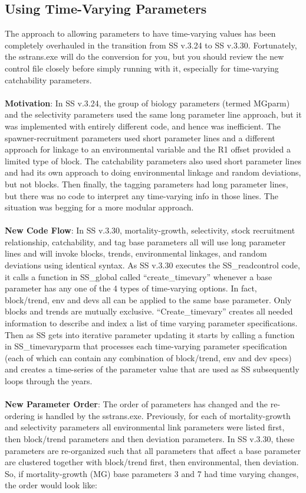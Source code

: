 \hypertarget{TVpara}{}
\subsection{Using Time-Varying Parameters}
 The approach to allowing parameters to have time-varying values has been completely overhauled in the transition from SS v.3.24 to SS v.3.30.  Fortunately, the sstrans.exe will do the conversion for you, but you should review the new control file closely before simply running with it, especially for time-varying catchability parameters.
 \\\\
 \noindent \textbf{Motivation}:  In SS v.3.24, the group of biology parameters (termed MGparm) and the selectivity parameters used the same long parameter line approach, but it was implemented with entirely different code, and hence was inefficient.  The spawner-recruitment parameters used short parameter lines and a different approach for linkage to an environmental variable and the R1 offset provided a limited type of block.  The catchability parameters also used short parameter lines and had its own approach to doing environmental linkage and random deviations, but not blocks.  Then finally, the tagging parameters had long parameter lines, but there was no code to interpret any time-varying info in those lines.  The situation was begging for a more modular approach.
 \\\\
 \noindent \textbf{New Code Flow}:  In SS v.3.30, mortality-growth, selectivity, stock recruitment relationship, catchability, and tag base parameters all will use long parameter lines and will invoke blocks, trends, environmental linkages, and random deviations using identical syntax.   As SS v.3.30 executes the SS\_readcontrol code, it calls a function in SS\_global called “create\_timevary” whenever a base parameter has any one of the 4 types of time-varying options.  In fact, block/trend, env and devs all can be applied to the same base parameter.  Only blocks and trends are mutually exclusive.  “Create\_timevary” creates all needed information to describe and index a list of time varying parameter specifications.  Then as SS gets into iterative parameter updating it starts by calling a function in SS\_timevaryparm that processes each time-varying parameter specification (each of which can contain any combination of block/trend, env and dev specs) and creates a time-series of the parameter value that are used as SS subsequently loops through the years.
 \\\\
 \noindent \textbf{New Parameter Order}: The order of parameters has changed and the re-ordering is handled by the sstrans.exe.  Previously, for each of mortality-growth and selectivity parameters all environmental link parameters were listed first, then block/trend parameters and then deviation parameters.  In SS v.3.30, these parameters are re-organized such that all parameters that affect a base parameter are clustered together with block/trend first, then environmental, then deviation.  So, if mortality-growth (MG) base parameters 3 and 7 had time varying changes, the order would look like:
 
